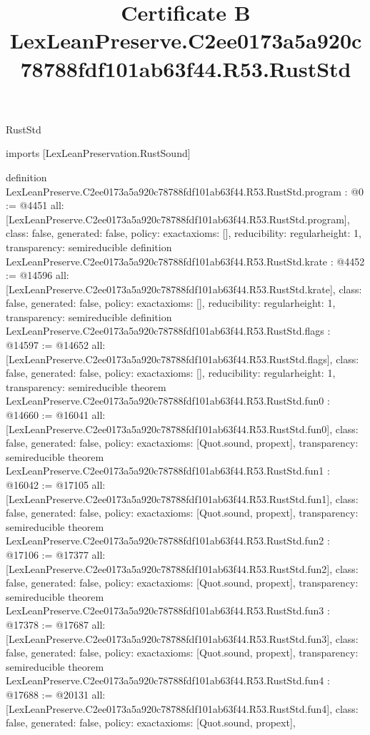 \begin{lexlean}{RustStd}
\title{Certificate B LexLeanPreserve.C2ee0173a5a920c78788fdf101ab63f44.R53.RustStd}
\begin{coremodule}
imports [LexLeanPreservation.RustSound]

definition LexLeanPreserve.C2ee0173a5a920c78788fdf101ab63f44.R53.RustStd.program : @0 := @4451 {
  all: [LexLeanPreserve.C2ee0173a5a920c78788fdf101ab63f44.R53.RustStd.program],
  class: false,
  generated: false,
  policy: exact{axioms: []},
  reducibility: regular{height: 1},
  transparency: semireducible
}
definition LexLeanPreserve.C2ee0173a5a920c78788fdf101ab63f44.R53.RustStd.krate : @4452 := @14596 {
  all: [LexLeanPreserve.C2ee0173a5a920c78788fdf101ab63f44.R53.RustStd.krate],
  class: false,
  generated: false,
  policy: exact{axioms: []},
  reducibility: regular{height: 1},
  transparency: semireducible
}
definition LexLeanPreserve.C2ee0173a5a920c78788fdf101ab63f44.R53.RustStd.flags : @14597 := @14652 {
  all: [LexLeanPreserve.C2ee0173a5a920c78788fdf101ab63f44.R53.RustStd.flags],
  class: false,
  generated: false,
  policy: exact{axioms: []},
  reducibility: regular{height: 1},
  transparency: semireducible
}
theorem LexLeanPreserve.C2ee0173a5a920c78788fdf101ab63f44.R53.RustStd.fun0 : @14660 := @16041 {
  all: [LexLeanPreserve.C2ee0173a5a920c78788fdf101ab63f44.R53.RustStd.fun0],
  class: false,
  generated: false,
  policy: exact{axioms: [Quot.sound, propext]},
  transparency: semireducible
}
theorem LexLeanPreserve.C2ee0173a5a920c78788fdf101ab63f44.R53.RustStd.fun1 : @16042 := @17105 {
  all: [LexLeanPreserve.C2ee0173a5a920c78788fdf101ab63f44.R53.RustStd.fun1],
  class: false,
  generated: false,
  policy: exact{axioms: [Quot.sound, propext]},
  transparency: semireducible
}
theorem LexLeanPreserve.C2ee0173a5a920c78788fdf101ab63f44.R53.RustStd.fun2 : @17106 := @17377 {
  all: [LexLeanPreserve.C2ee0173a5a920c78788fdf101ab63f44.R53.RustStd.fun2],
  class: false,
  generated: false,
  policy: exact{axioms: [Quot.sound, propext]},
  transparency: semireducible
}
theorem LexLeanPreserve.C2ee0173a5a920c78788fdf101ab63f44.R53.RustStd.fun3 : @17378 := @17687 {
  all: [LexLeanPreserve.C2ee0173a5a920c78788fdf101ab63f44.R53.RustStd.fun3],
  class: false,
  generated: false,
  policy: exact{axioms: [Quot.sound, propext]},
  transparency: semireducible
}
theorem LexLeanPreserve.C2ee0173a5a920c78788fdf101ab63f44.R53.RustStd.fun4 : @17688 := @20131 {
  all: [LexLeanPreserve.C2ee0173a5a920c78788fdf101ab63f44.R53.RustStd.fun4],
  class: false,
  generated: false,
  policy: exact{axioms: [Quot.sound, propext]},
}
\end{coremodule}
\end{lexlean}
